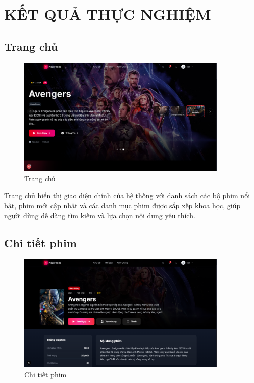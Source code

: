 \newpage
\section{\textbf{KẾT QUẢ THỰC NGHIỆM}}

\subsection{Trang chủ}
\begin{figure}[H]
	\centering
	\includegraphics[width=0.9\textwidth]{image/demo/trangchu.png}
	\caption{Trang chủ}
\end{figure}

Trang chủ hiển thị giao diện chính của hệ thống với danh sách các bộ phim nổi bật, phim mới cập nhật và các danh mục phim được sắp xếp khoa học, giúp người dùng dễ dàng tìm kiếm và lựa chọn nội dung yêu thích.


\subsection{Chi tiết phim}
\begin{figure}[H]
	\centering
	\includegraphics[width=0.9\textwidth]{image/demo/chitiet.png}
	\caption{Chi tiết phim}
\end{figure}

